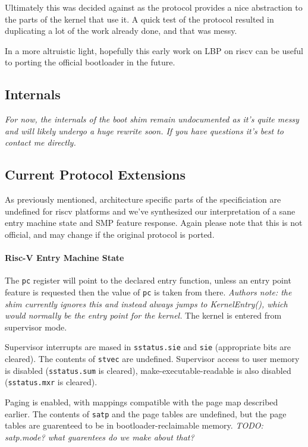 Ultimately this was decided against as the protocol provides a nice abstraction to the parts of the kernel that use it. A quick test of the protocol resulted in duplicating a lot of the work already done, and that was messy.

In a more altruistic light, hopefully this early work on LBP on riscv can be useful to porting the official bootloader in the future.

\subsection{Internals}
\textit{For now, the internals of the boot shim remain undocumented as it's quite messy and will likely undergo a huge rewrite soon. If you have questions it's best to contact me directly.}

\subsection{Current Protocol Extensions}
As previously mentioned, architecture specific parts of the specificiation are undefined for riscv platforms and we've synthesized our interpretation of a sane entry machine state and SMP feature response. Again please note that this is not official, and may change if the original protocol is ported.

\paragraph{Risc-V Entry Machine State}
The \verb|pc| register will point to the declared entry function, unless an entry point feature is requested then the value of \verb|pc| is taken from there. \textit{Authors note: the shim currently ignores this and instead always jumps to KernelEntry(), which would normally be the entry point for the kernel.} The kernel is entered from supervisor mode.

Supervisor interrupts are mased in \verb|sstatus.sie| and \verb|sie| (appropriate bits are cleared). The contents of \verb|stvec| are undefined. Supervisor access to user memory is disabled (\verb|sstatus.sum| is cleared), make-executable-readable is also disabled (\verb|sstatus.mxr| is cleared).

Paging is enabled, with mappings compatible with the page map described earlier. The contents of \verb|satp| and the page tables are undefined, but the page tables are guarenteed to be in bootloader-reclaimable memory. \textit{TODO: satp.mode? what guarentees do we make about that?}

